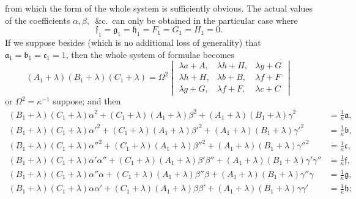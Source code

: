 \documentclass[11pt]{article}
\begin{document}
from which the form of the whole system is sufficiently obvious. The actual values of the coefficients $\alpha,\beta,\,$ \&c.\ can only be obtained in the particular case where
\[ \mathfrak{f}_1 = \mathfrak{g}_1 = \mathfrak{h}_1 = F_1 = G_1 = H_1 = 0. \]
If we suppose besides (which is no additional loss of generality) that $\mathfrak{a}_1 = \mathfrak{b}_1 = \mathfrak{c}_1 = 1$, then the whole system of formulae becomes
\[ (A_1+\lambda)(B_1+\lambda)(C_1+\lambda) = \Omega^2 \begin{vmatrix} \lambda a+A,& \lambda h+H,& \lambda g+G\\ \lambda h+H,& \lambda b+B,& \lambda f+F\\ \lambda g+G,& \lambda f+F,& \lambda c+C \end{vmatrix} \]
or $\Omega^2 = \kappa^{-1}$ suppose; and then
\[
\begin{aligned}
(B_1+\lambda)(C_1+\lambda)\alpha^2 + (C_1+\lambda)(A_1+\lambda)\beta^2 + (A_1+\lambda)(B_1+\lambda)\gamma^2 &= \tfrac{1}{\kappa}\mathfrak{a},\\
(B_1+\lambda)(C_1+\lambda)\alpha'^2 + (C_1+\lambda)(A_1+\lambda)\beta'^2 + (A_1+\lambda)(B_1+\lambda)\gamma'^2 &= \tfrac{1}{\kappa}\mathfrak{b},\\
(B_1+\lambda)(C_1+\lambda)\alpha''^2 + (C_1+\lambda)(A_1+\lambda)\beta''^2 + (A_1+\lambda)(B_1+\lambda)\gamma''^2 &= \tfrac{1}{\kappa}\mathfrak{c},\\
(B_1+\lambda)(C_1+\lambda)\alpha'\alpha'' + (C_1+\lambda)(A_1+\lambda)\beta'\beta'' + (A_1+\lambda)(B_1+\lambda)\gamma'\gamma'' &= \tfrac{1}{\kappa}\mathfrak{f},\\
(B_1+\lambda)(C_1+\lambda)\alpha''\alpha + (C_1+\lambda)(A_1+\lambda)\beta''\beta + (A_1+\lambda)(B_1+\lambda)\gamma''\gamma &= \tfrac{1}{\kappa}\mathfrak{g},\\
(B_1+\lambda)(C_1+\lambda)\alpha\alpha' + (C_1+\lambda)(A_1+\lambda)\beta\beta' + (A_1+\lambda)(B_1+\lambda)\gamma\gamma' &= \tfrac{1}{\kappa}\mathfrak{h};
\end{aligned}
\]
\end{document}
